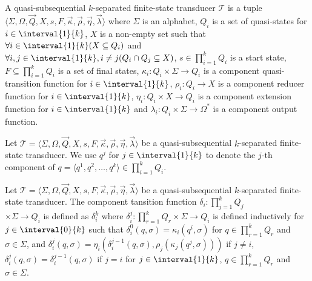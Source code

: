 \begin{definition}
	A quasi-subsequential $k$-separated finite-state transducer $\mathcal{T}$
	is a tuple $\langle \Sigma, \Omega, \vec{Q}, X, s, F, \vec{\kappa},
	\vec{\rho}, \vec{\eta}, \vec{\lambda} \rangle$ where $\Sigma$ is an
	alphabet, $Q_i$ is a set of quasi-states for $i \in \interval{1}{k}$, $X$
	is a non-empty set such that $\forall i \in \interval{1}{k} (X \subseteq
	Q_i)$ and $\forall i, j \in \interval{1}{k}, i \neq j (Q_i \cap Q_j
	\subseteq X)$, $s \in \prod_{i=1}^k{Q_i}$ is a start state, $F \subseteq
	\prod_{i=1}^k{Q_i}$ is a set of final states, $\kappa_i : Q_i \times \Sigma
	\rightarrow Q_i$ is a component quasi-transition function for $i \in
	\interval{1}{k}$, $\rho_i : Q_i \rightarrow X$ is a component reducer
	function for $i \in \interval{1}{k}$, $\eta_i : Q_i \times X \rightarrow
	Q_i$ is a component extension function for $i \in \interval{1}{k}$ and
	$\lambda_i : Q_i \times \Sigma \rightarrow \Omega^*$ is a component output
	function.
\end{definition}

\begin{remark}
	Let $\mathcal{T} = \langle \Sigma, \Omega, \vec{Q}, X, s, F, \vec{\kappa},
	\vec{\rho}, \vec{\eta}, \vec{\lambda} \rangle$ be a quasi-subsequential
	$k$-separated finite-state transducer. We use $q^j$ for $j \in
	\interval{1}{k}$ to denote the $j$-th component of $q = \langle q^1, q^2,
	\ldots, q^k \rangle \in \prod_{i=1}^k{Q_i}$.
\end{remark}

\begin{definition}
	Let $\mathcal{T} = \langle \Sigma, \Omega, \vec{Q}, X, s, F, \vec{\kappa},
	\vec{\rho}, \vec{\eta}, \vec{\lambda} \rangle$ be a quasi-subsequential
	$k$-separated finite-state transducer. The component tansition function
	$\delta_i : \prod_{j=1}^k{Q_j}$\\
	$\times \Sigma \rightarrow Q_i$ is defined as
	$\delta_i^k$ where $\delta_i^j : \prod_{r=1}^k{Q_r} \times \Sigma
	\rightarrow Q_i$ is defined inductively for $j \in \interval{0}{k}$ such
	that $\delta_i^0(q, \sigma) = \kappa_i(q^i, \sigma)$ for $q \in
	\prod_{r=1}^k{Q_r}$ and $\sigma \in \Sigma$, and $\delta_i^j(q, \sigma) =
	\eta_i(\delta_i^{j-1}(q, \sigma), \rho_j(\kappa_j(q^j, \sigma)))$ if $j
	\neq i$, $\delta_i^j(q, \sigma) = \delta_i^{j-1}(q, \sigma)$ if $j = i$ for
	$j \in \interval{1}{k}$, $q \in \prod_{r=1}^k{Q_r}$ and $\sigma \in \Sigma$.
\end{definition}

